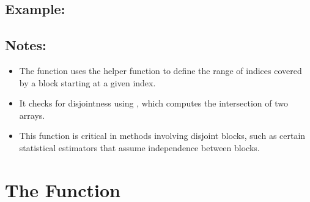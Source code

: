 \documentclass[a4paper,11pt,openany,english]{sphinxmanual}
\begin{document}
\begin{fulllineitems}
\subsection{Example:}
\label{\detokenize{api_biascorrection:id3}}
\begin{sphinxVerbatim}[commandchars=\\\{\}]
   
  
        
 
\end{sphinxVerbatim}


\subsection{Notes:}
\label{\detokenize{api_biascorrection:notes}}\begin{itemize}
\item {} 
\sphinxAtStartPar
The function uses the helper function  to define the range of indices 
covered by a block starting at a given index.

\item {} 
\sphinxAtStartPar
It checks for disjointness using , which computes the 
intersection of two arrays.

\item {} 
\sphinxAtStartPar
This function is critical in methods involving disjoint blocks, such as 
certain statistical estimators that assume independence between blocks.

\end{itemize}

\end{fulllineitems}



\section{The  Function}
\label{\detokenize{api_biascorrection:the-exceedances-function}}
\end{document}

